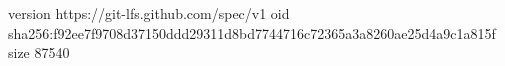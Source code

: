 version https://git-lfs.github.com/spec/v1
oid sha256:f92ee7f9708d37150ddd29311d8bd7744716c72365a3a8260ae25d4a9c1a815f
size 87540
